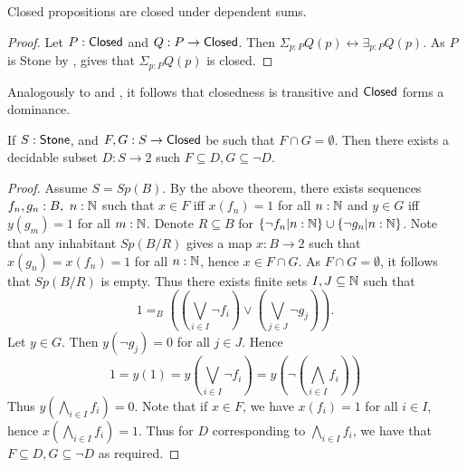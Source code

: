 \begin{corollary}\label{ClosedDependentSums}
  Closed propositions are closed under dependent sums. 
\end{corollary}
\begin{proof}
  Let $P:\mathsf{Closed}$ and $Q:P \to \mathsf{Closed}$. 
  Then $\Sigma_{p:P} Q(p) \leftrightarrow \exists_{p:P} Q(p)$.
  As $P$ is Stone by , 
   gives that $\Sigma_{p:P} Q(p)$ is closed. 
\end{proof}
\begin{remark}
  Analogously to  and , it follows that 
  closedness is transitive and $\mathsf{Closed}$ forms a dominance. 
\end{remark}


\begin{lemma}\label{StoneSeperated}
  If $S:\mathsf{Stone} $, and $F,G:S \to \mathsf{Closed}$ be such that $F\cap G = \emptyset$. 
  Then there exists a decidable subset $D:S \to 2$ such $F\subseteq D, G \subseteq \neg D$. 
\end{lemma}
\begin{proof}
  Assume $S = Sp(B)$. 
  By the above theorem, there exists sequences $f_n,g_n:B,~n:\mathbb{N}$ such that 
  $x\in F$ iff $x(f_n) = 1$ for all $n:\mathbb{N}$ and 
  $y\in G$ iff $y(g_m) = 1$ for all $m:\mathbb{N}$. 
%
  Denote $R\subseteq B$ for $\{\neg f_n|n:\mathbb{N}\} \cup\{\neg g_n|n:\mathbb{N}\}$. 
  Note that any inhabitant $Sp(B/R)$ gives a map $x:B\to 2$ such that
  $x(g_n)= x(f_n) = 1$ for all $n:\mathbb{N}$, hence $x\in F \cap G$. 
  As $F\cap G = \emptyset $, it follows that $Sp(B/R)$ is empty.
%
  Thus there exists finite sets $I,J\subseteq \mathbb{N} $ such that 
  $$1 =_B ((\bigvee_{i\in I} \neg f_i) \vee (\bigvee_{j\in J} \neg g_j)).$$
%
  Let $y\in G$. Then $y(\neg g_j) = 0$ for all $j \in J$. 
  Hence 
  $$
  1 = y(1) 
  = 
  y(\bigvee_{i\in I} \neg f_i) = y (\neg (\bigwedge_{i\in I} f_i))
  $$
  Thus $y(\bigwedge_{i\in I} f_i) = 0$. 
  Note that if $x\in F$, we have $x(f_i) = 1$ for all $i\in I$, hence 
  $x(\bigwedge_{i\in I} f_i) = 1$. 
  Thus for $D$ corresponding to $\bigwedge_{i\in I} f_i$, we have that 
  $F\subseteq D, G\subseteq \neg D$ as required. 
\end{proof} 

